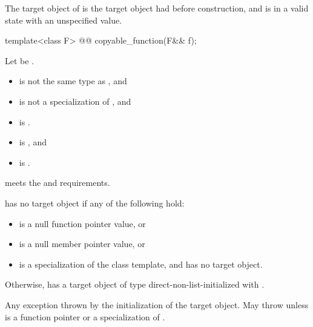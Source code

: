 \begin{itemdescr}
\pnum
\ensures
The target object of  is the target object  had before construction, and  is in a valid state with an unspecified value.
\end{itemdescr}

%
\begin{itemdecl}
template<class F>
  @@ copyable_function(F&& f);
\end{itemdecl}

\begin{itemdescr}
\pnum
Let  be .

\pnum
\constraints
\begin{itemize}
\item {} is not the same type as , and
\item {} is not a specialization of , and
\item {} is .
\end{itemize}

\pnum
\mandates
\begin{itemize}
\item {} is , and
\item {} is .
\end{itemize}

\pnum
\expects
{} meets the  and  requirements.

\pnum
\ensures
{} has no target object if any of the following hold:
\begin{itemize}
\item {} is a null function pointer value, or
\item {} is a null member pointer value, or
\item {} is a specialization of the  class template, and  has no target object.
\end{itemize}
Otherwise,  has a target object of type  direct-non-list-initialized with .

\pnum
\throws
Any exception thrown by the initialization of the target object. May throw  unless  is a function pointer or a specialization of .
\end{itemdescr}

